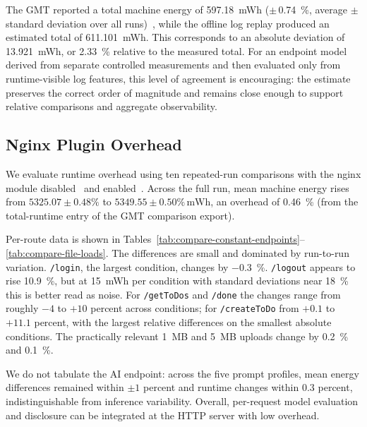 \documentclass[sigconf]{acmart}
\begin{document}
The GMT reported a total machine energy of
\SI{597.18}{mWh} (\(\pm\)\,\SI{0.74}{\percent}, average \(\pm\) standard deviation over all runs)~\cite{gmt-run-validation-reference}, while the offline log replay produced an estimated total of \SI{611.101}{mWh}. This corresponds to an absolute deviation of
\SI{13.921}{mWh}, or \SI{2.33}{\percent} relative to the measured total. For an
endpoint model derived from separate controlled measurements and then evaluated
only from runtime-visible log features, this level of agreement is encouraging:
the estimate preserves the correct order of magnitude and remains close enough
to support relative comparisons and aggregate observability.

\subsection{Nginx Plugin Overhead}
We evaluate runtime overhead using ten repeated-run comparisons with the nginx module disabled~\cite{gmt-run-overhead-disabled} and enabled~\cite{gmt-run-overhead-enabled}. Across the full run, mean machine energy rises from $5325.07 \pm 0.48\%$ to $5349.55 \pm 0.50\%\,\mathrm{mWh}$, an overhead of \SI{0.46}{\percent} (from the total-runtime entry of the GMT comparison export).

Per-route data is shown in Tables~\ref{tab:compare-constant-endpoints}--\ref{tab:compare-file-loads}. The differences are small and dominated by run-to-run variation. \texttt{/login}, the largest condition, changes by \SI{-0.3}{\percent}. \texttt{/logout} appears to rise \SI{10.9}{\percent}, but at \SI{15}{mWh} per condition with standard deviations near \SI{18}{\percent} this is better read as noise. For \texttt{/getToDos} and \texttt{/done} the changes range from roughly $-4$ to $+10$ percent across conditions; for \texttt{/createToDo} from $+0.1$ to $+11.1$ percent, with the largest relative differences on the smallest absolute conditions. The practically relevant \SI{1}{MB} and \SI{5}{MB} uploads change by \SI{0.2}{\percent} and \SI{0.1}{\percent}.

We do not tabulate the AI endpoint: across the five prompt profiles, mean energy differences remained within $\pm 1$ percent and runtime changes within $0.3$ percent, indistinguishable from inference variability. Overall, per-request model evaluation and disclosure can be integrated at the HTTP server with low overhead.
\end{document}
